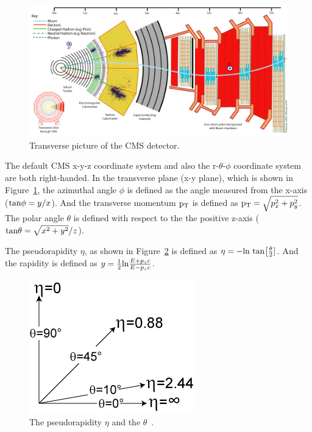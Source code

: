 \begin{figure}[!htbp]
\centering
\includegraphics[width=.9\textwidth]{figures/CMS_Slice.png}
\caption{Transverse picture of the CMS detector.}
\label{fig:CMS_Slice}
\end{figure}


The default CMS x-y-z coordinate system and also the r-$\theta$-$\phi$ coordinate system are both right-handed. In the transverse plane (x-y plane), which is shown in Figure~\ref{fig:CMS_Slice},  the azimuthal angle 
$\phi$ is defined as the angle measured from the x-axis (${\rm tan}\phi = y/x$). And the transverse momentum $\mathrm{p_{T}}$ is defined as $\mathrm{p_{T}} = \sqrt{p_x^2 +p_y^2}$.  The polar angle $\theta$ is defined with respect to the the positive z-axis (${\rm tan}\theta = \sqrt{x^2+y^2}/z$).


The pseudorapidity $\eta$, as shown in Figure~\ref{fig:pseudo} is defined as $\eta = -{\rm ln}~{\rm tan}\big[\frac{\theta}{2}]$. And the rapidity is defined as $y = \frac{1}{2} {\rm ln} \frac{E+p_zc}{E-p_zc}$.  

\begin{figure}[!htbp]
\centering
\includegraphics[width=.9\textwidth]{figures/pseudorapidity.png}
\caption{The pseudorapidity $\eta$ and the $\theta$~\cite{wiki2}.}
\label{fig:pseudo}
\end{figure}


